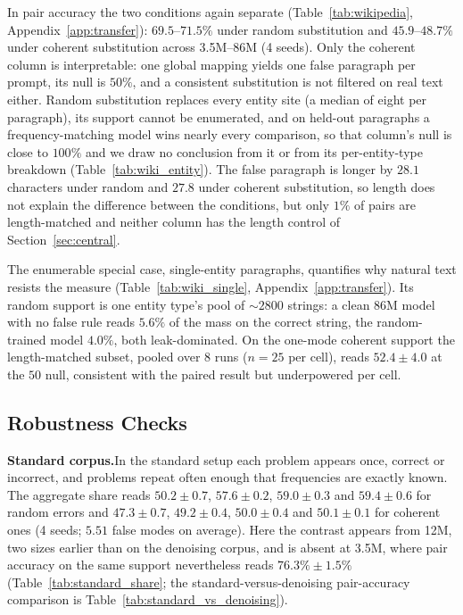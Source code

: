 \documentclass{article}
\begin{document}
In pair accuracy the two conditions again separate (Table~\ref{tab:wikipedia}, Appendix~\ref{app:transfer}): $69.5$--$71.5\%$ under random substitution and $45.9$--$48.7\%$ under coherent substitution across 3.5M--86M (4 seeds). Only the coherent column is interpretable: one global mapping yields one false paragraph per prompt, its null is $50\%$, and a consistent substitution is not filtered on real text either. Random substitution replaces every entity site (a median of eight per paragraph), its support cannot be enumerated, and on held-out paragraphs a frequency-matching model wins nearly every comparison, so that column's null is close to $100\%$ and we draw no conclusion from it or from its per-entity-type breakdown (Table~\ref{tab:wiki_entity}). The false paragraph is longer by $28.1$ characters under random and $27.8$ under coherent substitution, so length does not explain the difference between the conditions, but only $1\%$ of pairs are length-matched and neither column has the length control of Section~\ref{sec:central}.

The enumerable special case, single-entity paragraphs, quantifies why natural text resists the measure (Table~\ref{tab:wiki_single}, Appendix~\ref{app:transfer}). Its random support is one entity type's pool of ${\sim}2800$ strings: a clean 86M model with no false rule reads $5.6\%$ of the mass on the correct string, the random-trained model $4.0\%$, both leak-dominated. On the one-mode coherent support the length-matched subset, pooled over 8 runs ($n{=}25$ per cell), reads $52.4 \pm 4.0$ at the $50$ null, consistent with the paired result but underpowered per cell.

\subsection{Robustness Checks}
\label{sec:robustness}

\textbf{Standard corpus.}\quad In the standard setup each problem appears once, correct or incorrect, and problems repeat often enough that frequencies are exactly known. The aggregate share reads $50.2 \pm 0.7$, $57.6 \pm 0.2$, $59.0 \pm 0.3$ and $59.4 \pm 0.6$ for random errors and $47.3 \pm 0.7$, $49.2 \pm 0.4$, $50.0 \pm 0.4$ and $50.1 \pm 0.1$ for coherent ones (4 seeds; $5.51$ false modes on average). Here the contrast appears from 12M, two sizes earlier than on the denoising corpus, and is absent at 3.5M, where pair accuracy on the same support nevertheless reads $76.3\% \pm 1.5\%$ (Table~\ref{tab:standard_share}; the standard-versus-denoising pair-accuracy comparison is Table~\ref{tab:standard_vs_denoising}).
\end{document}
